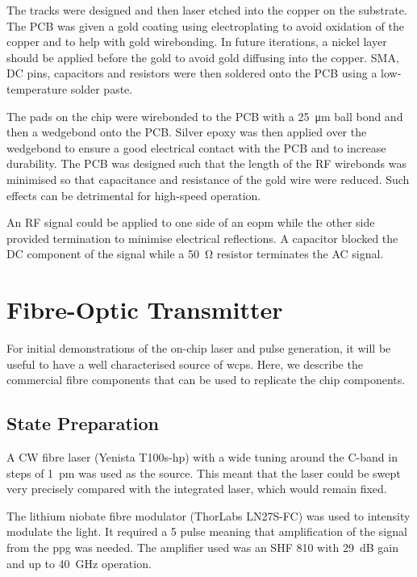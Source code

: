 The tracks were designed and then laser etched into the copper on the substrate. The PCB was given a gold coating using electroplating to avoid oxidation of the copper and to help with gold wirebonding. In future iterations, a nickel layer should be applied before the gold to avoid gold diffusing into the copper. SMA, DC pins, capacitors and resistors were then soldered onto the PCB using a low-temperature solder paste.

The pads on the chip were wirebonded to the PCB with a \SI{25}{\micro\meter} ball bond and then a wedgebond onto the PCB. Silver epoxy was then applied over the wedgebond to ensure a good electrical contact with the PCB and to increase durability. The PCB was designed such that the length of the RF wirebonds was minimised so that capacitance and resistance of the gold wire were reduced. Such effects can be detrimental for high-speed operation.

An RF signal could be applied to one side of an \ac{eopm} while the other side provided termination to minimise electrical reflections. A capacitor blocked the DC component of the signal while a \SI{50}{\ohm} resistor terminates the AC signal. 

\section{Fibre-Optic Transmitter}

For initial demonstrations of the on-chip laser and pulse generation, it will be useful to have a well characterised source of \acp{wcp}. Here, we describe the commercial fibre components that can be used to replicate the chip components.

\subsection{State Preparation}

A \ac{CW} fibre laser (Yenista T100s-hp) with a wide tuning around the C-band in steps of \SI{1}{\pm} was used as the source. This meant that the laser could be swept very precisely compared with the integrated laser, which would remain fixed. 

The lithium niobate fibre modulator (ThorLabs LN27S-FC) was used to intensity modulate the light. It required a \SI{5}{\Vpp} pulse meaning that amplification of the signal from the \ac{ppg} was needed. The amplifier used was an SHF 810 with \SI{29}{dB} gain and up to \SI{40}{\GHz} operation.

